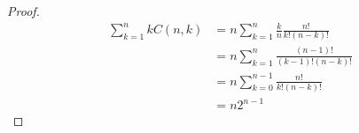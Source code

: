 \begin{proof}
    \begin{align*}
        \sum_{k=1}^{n} kC(n,k) &= n\sum_{k=1}^{n} \frac{k}{n}\frac{n!}{k!(n-k)!}\\
        &= n\sum_{k=1}^{n} \frac{(n-1)!}{(k-1)!(n-k)!}\\
        &= n\sum_{k=0}^{n-1} \frac{n!}{k!(n-k)!}\\
        &= n2^{n-1}
    \end{align*}
\end{proof}